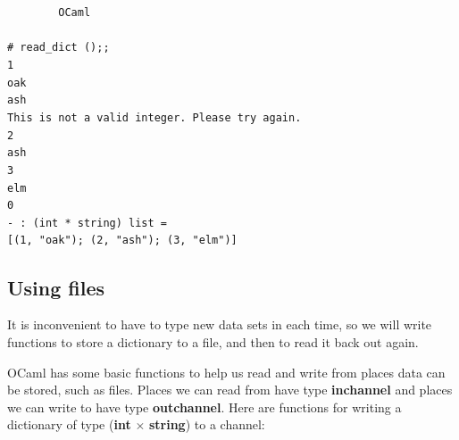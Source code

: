 \documentclass[]{book}
\newcommand{\smspace}{\vspace{4mm}}
\begin{document}
\smspace
\noindent\verb!        OCaml!\\
\noindent\\
\noindent\verb!# read_dict ();;!\\
\noindent\verb!1!\\
\noindent\verb!oak!\\
\noindent\verb!ash!\\ 
\noindent\verb!This is not a valid integer. Please try again.!\\
\noindent\verb!2!\\
\noindent\verb!ash!\\
\noindent\verb!3!\\
\noindent\verb!elm!\\
\noindent\verb!0!\\
\noindent\verb!- : (int * string) list =!\\
\noindent\verb![(1, "oak"); (2, "ash"); (3, "elm")]!

\subsection*{Using files}

It is inconvenient to have to type new data sets in each time, so we will write functions to store a dictionary to a file, and then to read it back out again. 

OCaml has some basic functions to help us read and write from places data can be stored, such as files. Places we can read from have type \textrm{\textbf{in\raisebox{2pt}{\_}channel}} and places we can write to have type \textrm{\textbf{out\raisebox{2pt}{\_}channel}}. Here are functions for writing a dictionary of type \textrm{\textmd{(}\textbf{int} $\times$ \textbf{string}\textmd{)}} to a channel: 
\end{document}
